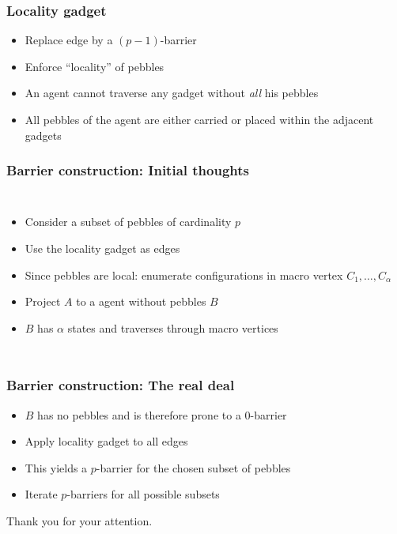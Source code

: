 \documentclass{beamer}
\begin{document}
\begin{frame}
  \frametitle{Locality gadget}
  \begin{itemize}
    \item Replace edge by a $(p-1)$-barrier
    \item Enforce \enquote{locality} of pebbles
    \item An agent cannot traverse any gadget without \emph{all} his pebbles
    \item All pebbles of the agent are either carried or placed within the
      adjacent gadgets
  \end{itemize}
  \begin{center}
  \end{center}
\end{frame}

\begin{frame}
  \frametitle{Barrier construction: Initial thoughts}
  \begin{columns}
    \begin{itemize}
      \item Consider a subset of pebbles of cardinality $p$
      \item Use the locality gadget as edges
      \item Since pebbles are local: enumerate configurations in macro vertex
        $C_{1},\dots,C_{\alpha}$
      \item Project $A$ to a agent without pebbles $B$
      \item $B$ has $\alpha$ states and traverses through macro vertices
    \end{itemize}
    \resizebox{\textwidth}{!}{}
  \end{columns}
\end{frame}

\begin{frame}
  \frametitle{Barrier construction: The real deal}
  \begin{itemize}
    \item $B$ has no pebbles and is therefore prone to a $0$-barrier
    \item Apply locality gadget to all edges
    \item This yields a $p$-barrier for the chosen subset of pebbles
    \item Iterate $p$-barriers for all possible subsets
  \end{itemize}
  \begin{center}
    \resizebox{0.8\textwidth}{!}{}
  \end{center}
\end{frame}

\begin{frame}
  \begin{center}
    \Huge Thank you for your attention.
  \end{center}
\end{frame}
\end{document}
